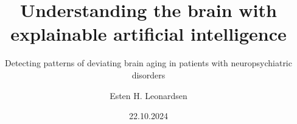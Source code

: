 \documentclass{beamer}
\title{Understanding the brain with explainable artificial intelligence}
\subtitle{Detecting patterns of deviating brain aging in patients with neuropsychiatric disorders}
\date{22.10.2024}
\author{Esten H. Leonardsen}
\begin{document}
    \begin{frame}
        \titlepage
    \end{frame}







\end{document}
